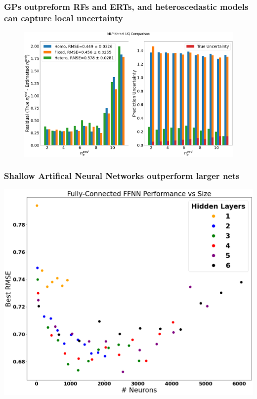\documentclass{beamer}
\begin{document}
\begin{frame}
\frametitle{GPs outpreform RFs and ERTs, and heteroscedastic models can capture local uncertainty}
\begin{figure}
\centering
\includegraphics[scale=0.19]{./src/MLP_UQ_compare}
\end{figure}
\end{frame}

\begin{frame}
\frametitle{Shallow Artifical Neural Networks outperform larger nets}
\includegraphics[scale=0.27]{./src/ANN_performace_size}
\end{frame}
\end{document}
